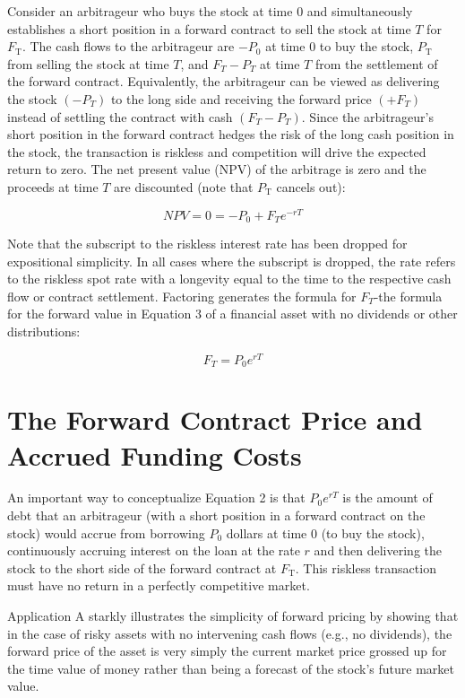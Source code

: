 \documentclass[11pt]{article}
\begin{document}
Consider an arbitrageur who buys the stock at time 0 and simultaneously establishes a short position in a forward contract to sell the stock at time $T$ for $F_{\mathrm{T}}$. The cash flows to the arbitrageur are $-P_{0}$ at time 0 to buy the stock, $P_{\mathrm{T}}$ from selling the stock at time $T$, and $F_{T}-P_{T}$ at time $T$ from the settlement of the forward contract. Equivalently, the arbitrageur can be viewed as delivering the stock $\left(-P_{T}\right)$ to the long side and receiving the forward price $\left(+F_{T}\right)$ instead of settling the contract with cash $\left(F_{T}-P_{T}\right)$. Since the arbitrageur's short position in the forward contract hedges the risk of the long cash position in the stock, the transaction is riskless and competition will drive the expected return to zero. The net present value (NPV) of the arbitrage is zero and the proceeds at time $T$ are discounted (note that $P_{\mathrm{T}}$ cancels out):


\begin{equation*}
N P V=0=-P_{0}+F_{T} e^{-r T} \tag{1}
\end{equation*}


Note that the subscript to the riskless interest rate has been dropped for expositional simplicity. In all cases where the subscript is dropped, the rate refers to the riskless spot rate with a longevity equal to the time to the respective cash flow or contract settlement. Factoring generates the formula for $F_{T}$-the formula for the forward value in Equation 3 of a financial asset with no dividends or other distributions:


\begin{equation*}
F_{T}=P_{0} e^{r T} \tag{2}
\end{equation*}


\section*{The Forward Contract Price and Accrued Funding Costs}
An important way to conceptualize Equation 2 is that $P_{0} e^{r T}$ is the amount of debt that an arbitrageur (with a short position in a forward contract on the stock) would accrue from borrowing $P_{0}$ dollars at time 0 (to buy the stock), continuously accruing interest on the loan at the rate $r$ and then delivering the stock to the short side of the forward contract at $F_{\mathrm{T}}$. This riskless transaction must have no return in a perfectly competitive market.

Application A starkly illustrates the simplicity of forward pricing by showing that in the case of risky assets with no intervening cash flows (e.g., no dividends), the forward price of the asset is very simply the current market price grossed up for the time value of money rather than being a forecast of the stock's future market value.
\end{document}
